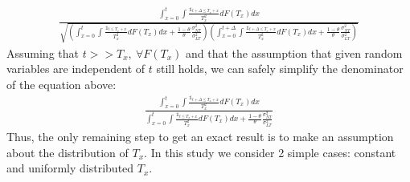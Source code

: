 \documentclass[12pt]{article}
\begin{document}
\begin{equation*}
\begin{gathered}
\frac{\int_{x=0}^{t}\int\frac{\mathds{1}_{t+\Delta\leq T_x+x}}{T_x^2}dF(T_x)dx}
{\sqrt{(\int_{x=0}^{t}\int\frac{\mathds{1}_{t\leq T_x+x}}{T_x^2}dF(T_x)dx+\frac{1-\theta}{\theta}\frac{\sigma^2_{NT}}{\sigma^2_{LT}})
(\int_{x=0}^{t+\Delta}\int\frac{\mathds{1}_{t+\Delta\leq T_x+x}}{T_x^2}dF(T_x)dx+\frac{1-\theta}{\theta}\frac{\sigma^2_{NT}}{\sigma^2_{LT}})}}
\end{gathered}
\end{equation*}
Assuming that $t>>T_x,\ \forall F(T_x)$ and that the assumption that given random variables are independent of $t$ still holds, we can safely simplify the denominator of the equation above:
\begin{equation}\label{acorfinal}
\begin{gathered}
\frac{\int_{x=0}^{t}\int\frac{\mathds{1}_{t+\Delta\leq T_x+x}}{T_x^2}dF(T_x)dx}
{\int_{x=0}^{t}\int\frac{\mathds{1}_{t\leq T_x+x}}{T_x^2}dF(T_x)dx+\frac{1-\theta}{\theta}\frac{\sigma^2_{NT}}{\sigma^2_{LT}}}
\end{gathered}
\end{equation}
Thus, the only remaining step to get an exact result is to make an assumption about the distribution of $T_x$. In this study we consider 2 simple cases: constant and uniformly distributed  $T_x$.
\end{document}
